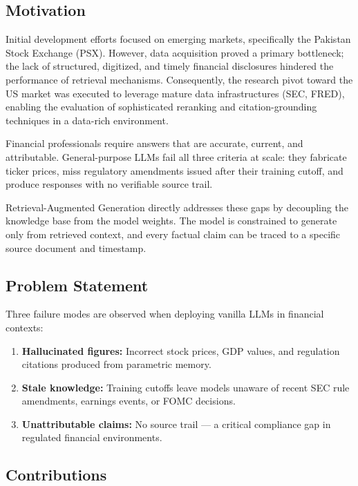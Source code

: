 \documentclass[10pt,a4paper,twocolumn]{article}
\begin{document}
\subsection{Motivation}

Initial development efforts focused on emerging markets, specifically the Pakistan Stock Exchange (PSX). However, data acquisition proved a primary bottleneck; the lack of structured, digitized, and timely financial disclosures hindered the performance of retrieval mechanisms. Consequently, the research pivot toward the US market was executed to leverage mature data infrastructures (SEC, FRED), enabling the evaluation of sophisticated reranking and citation-grounding techniques in a data-rich environment.

Financial professionals require answers that are accurate, current, and attributable. General-purpose
LLMs fail all three criteria at scale: they fabricate ticker prices, miss regulatory amendments
issued after their training cutoff, and produce responses with no verifiable source trail.

Retrieval-Augmented Generation \cite{lewis2020rag} directly addresses these gaps by decoupling
the knowledge base from the model weights. The model is constrained to generate only from
retrieved context, and every factual claim can be traced to a specific source document and timestamp.

\subsection{Problem Statement}

Three failure modes are observed when deploying vanilla LLMs in financial contexts:

\begin{enumerate}[label=\arabic*.]
  \item \textbf{Hallucinated figures:} Incorrect stock prices, GDP values, and regulation
        citations produced from parametric memory.
  \item \textbf{Stale knowledge:} Training cutoffs leave models unaware of recent SEC rule
        amendments, earnings events, or FOMC decisions.
  \item \textbf{Unattributable claims:} No source trail --- a critical compliance gap in
        regulated financial environments.
\end{enumerate}

\subsection{Contributions}
\end{document}
